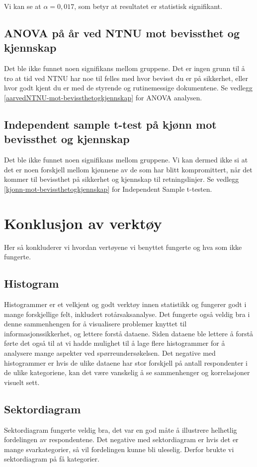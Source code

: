 Vi kan se at \(\alpha = 0,017\), som betyr at resultatet er statistisk signifikant. 


\subsection{ANOVA på år ved NTNU mot bevissthet og kjennskap}
Det ble ikke funnet noen signifikans mellom gruppene. Det er ingen grunn til å tro at tid ved NTNU har noe til felles med hvor bevisst du er på sikkerhet, eller hvor godt kjent du er med de styrende og rutinemessige dokumentene. Se vedlegg \ref{aarvedNTNU-mot-bevissthetogkjennskap} for ANOVA analysen.


\subsection{Independent sample t-test på kjønn mot bevissthet og kjennskap}
Det ble ikke funnet noen signifikans mellom gruppene. Vi kan dermed ikke si at det er noen forskjell mellom kjønnene av de som har blitt kompromittert, når det kommer til bevissthet på sikkerhet og kjennskap til retningslinjer. Se vedlegg \ref{kjonn-mot-bevissthetogkjennskap} for Independent Sample t-testen. 



\section{Konklusjon av verktøy}
Her så konkluderer vi hvordan vertøyene vi benyttet fungerte og hva som ikke fungerte. 

\subsection{Histogram}
Histogrammer er et velkjent og godt verktøy innen statistikk og fungerer godt i mange forskjellige felt, inkludert rotårsaksanalyse.  Det fungerte også veldig bra i denne sammenhengen for å visualisere problemer knyttet til informasjonssikkerhet, og lettere forstå dataene. Siden dataene ble lettere å forstå førte det også til at vi hadde mulighet til å lage flere histogrammer for å analysere mange aspekter ved spørreundersøkelsen. Det negative med histogrammer er hvis de ulike dataene har stor forskjell på antall respondenter i de ulike kategoriene, kan det være vanskelig å se sammenhenger og korrelasjoner visuelt sett. 

\subsection{Sektordiagram}
Sektordiagram fungerte veldig bra, det var en god måte å illustrere helhetlig fordelingen av respondentene. Det negative med sektordiagram er hvis det er mange svarkategorier, så vil fordelingen kunne bli uleselig. Derfor brukte vi sektordiagram på få kategorier. 

